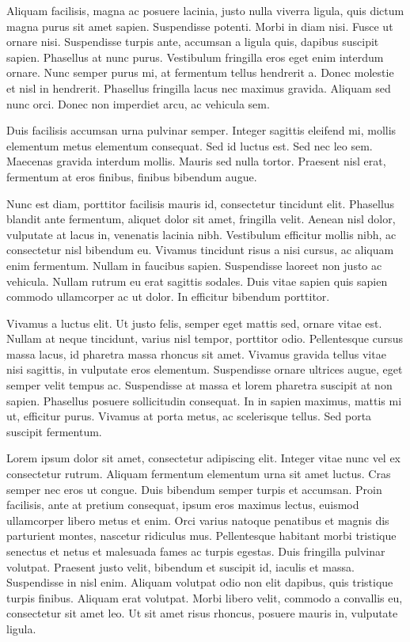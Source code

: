 \documentclass[12pt,a4paper,twoside]{book}
\begin{document}
Aliquam facilisis, magna ac posuere lacinia, justo nulla viverra ligula, quis dictum magna purus sit amet sapien. Suspendisse potenti. Morbi in diam nisi. Fusce ut ornare nisi. Suspendisse turpis ante, accumsan a ligula quis, dapibus suscipit sapien. Phasellus at nunc purus. Vestibulum fringilla eros eget enim interdum ornare. Nunc semper purus mi, at fermentum tellus hendrerit a. Donec molestie et nisl in hendrerit. Phasellus fringilla lacus nec maximus gravida. Aliquam sed nunc orci. Donec non imperdiet arcu, ac vehicula sem.

Duis facilisis accumsan urna pulvinar semper. Integer sagittis eleifend mi, mollis elementum metus elementum consequat. Sed id luctus est. Sed nec leo sem. Maecenas gravida interdum mollis. Mauris sed nulla tortor. Praesent nisl erat, fermentum at eros finibus, finibus bibendum augue.

Nunc est diam, porttitor facilisis mauris id, consectetur tincidunt elit. Phasellus blandit ante fermentum, aliquet dolor sit amet, fringilla velit. Aenean nisl dolor, vulputate at lacus in, venenatis lacinia nibh. Vestibulum efficitur mollis nibh, ac consectetur nisl bibendum eu. Vivamus tincidunt risus a nisi cursus, ac aliquam enim fermentum. Nullam in faucibus sapien. Suspendisse laoreet non justo ac vehicula. Nullam rutrum eu erat sagittis sodales. Duis vitae sapien quis sapien commodo ullamcorper ac ut dolor. In efficitur bibendum porttitor.

Vivamus a luctus elit. Ut justo felis, semper eget mattis sed, ornare vitae est. Nullam at neque tincidunt, varius nisl tempor, porttitor odio. Pellentesque cursus massa lacus, id pharetra massa rhoncus sit amet. Vivamus gravida tellus vitae nisi sagittis, in vulputate eros elementum. Suspendisse ornare ultrices augue, eget semper velit tempus ac. Suspendisse at massa et lorem pharetra suscipit at non sapien. Phasellus posuere sollicitudin consequat. In in sapien maximus, mattis mi ut, efficitur purus. Vivamus at porta metus, ac scelerisque tellus. Sed porta suscipit fermentum.

Lorem ipsum dolor sit amet, consectetur adipiscing elit. Integer vitae nunc vel ex consectetur rutrum. Aliquam fermentum elementum urna sit amet luctus. Cras semper nec eros ut congue. Duis bibendum semper turpis et accumsan. Proin facilisis, ante at pretium consequat, ipsum eros maximus lectus, euismod ullamcorper libero metus et enim. Orci varius natoque penatibus et magnis dis parturient montes, nascetur ridiculus mus. Pellentesque habitant morbi tristique senectus et netus et malesuada fames ac turpis egestas. Duis fringilla pulvinar volutpat. Praesent justo velit, bibendum et suscipit id, iaculis et massa. Suspendisse in nisl enim. Aliquam volutpat odio non elit dapibus, quis tristique turpis finibus. Aliquam erat volutpat. Morbi libero velit, commodo a convallis eu, consectetur sit amet leo. Ut sit amet risus rhoncus, posuere mauris in, vulputate ligula.
\end{document}
